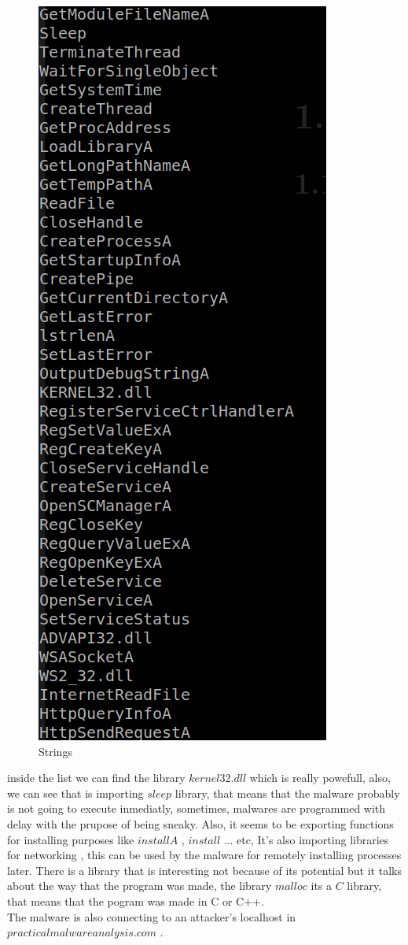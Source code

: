 \documentclass[12pt,letter]{article} %
\begin{document}
            \begin{figure}[h!]
                \centering
                \includegraphics[width=0.4\linewidth]{strings.png}
                \caption{Strings}
                \label{strings}
            \end{figure}
            inside the list we can find the library $ kernel32.dll  $ which is
            really powefull, also, we can see that is importing $ sleep  $
            library, that means that the malware probably is not going to
            execute inmediatly, sometimes, malwares are programmed with delay
            with the prupose of being sneaky. Also, it seems to be exporting functions
            for installing purposes like $ installA  $ , $ install  $ ... etc,
            It's also importing libraries for networking
            , this can be used by the malware for remotely installing processes later.
            There is a library that is interesting not because of its
            potential but it talks about the way that the program was made, the
            library $ malloc  $ its a $ C  $ library, that means that the
            pogram was made in C or C++.
            \\ The malware is also connecting to an attacker's localhost in $
            practicalmalwareanalysis.com  $ .
\end{document}
